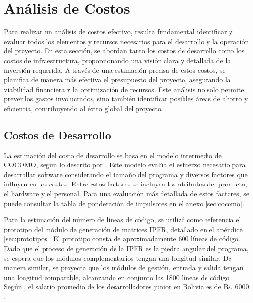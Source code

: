 \section{Análisis de Costos}

Para realizar un análisis de costos efectivo, resulta fundamental identificar y evaluar todos los elementos y recursos necesarios para el desarrollo y la operación del proyecto. En esta sección, se abordan tanto los costos de desarrollo como los costos de infraestructura, proporcionando una visión clara y detallada de la inversión requerida. A través de una estimación precisa de estos costos, se planifica de manera más efectiva el presupuesto del proyecto, asegurando la viabilidad financiera y la optimización de recursos. Este análisis no solo permite prever los gastos involucrados, sino también identificar posibles áreas de ahorro y eficiencia, contribuyendo al éxito global del proyecto.

\subsection{Costos de Desarrollo}
La estimación del costo de desarrollo se basa en el modelo intermedio de COCOMO, según lo descrito por \textcite{basavaraj2008empirical}. Este modelo evalúa el esfuerzo necesario para desarrollar software considerando el tamaño del programa y diversos factores que influyen en los costos. Entre estos factores se incluyen los atributos del producto, el hardware y el personal. Para una evaluación más detallada de estos factores, se puede consultar la tabla de ponderación de impulsores en el anexo \ref{sec:cocomo}.

Para la estimación del número de líneas de código, se utilizó como referencia el prototipo del módulo de generación de matrices IPER, detallado en el apéndice \ref{sec:prototipos}. El prototipo consta de aproximadamente 600 líneas de código. Dado que el proceso de generación de la IPER es la piedra angular del programa, se espera que los módulos complementarios tengan una longitud similar. De manera similar, se proyecta que los módulos de gestión, entrada y salida tengan una longitud comparable, alcanzando en conjunto las 1800 líneas de código. Según \textcite{glassdoor2024}, el salario promedio de los desarrolladores junior en Bolivia es de Bs. $6000$.

